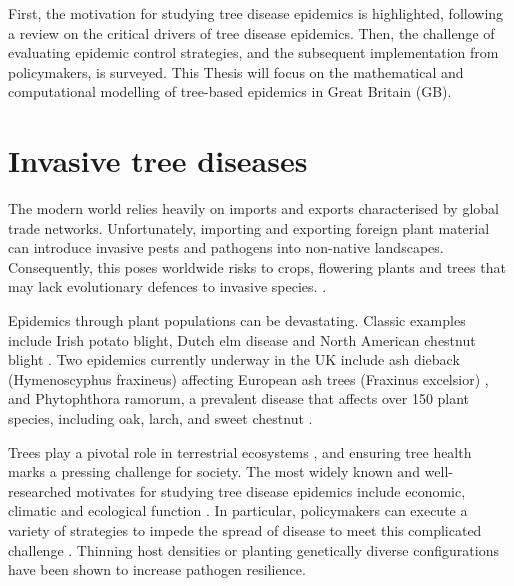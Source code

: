 First, the motivation for studying tree disease epidemics is highlighted, 
following a review on the critical drivers of tree disease epidemics. 
Then, the challenge of evaluating epidemic control strategies, and the subsequent implementation from policymakers, is surveyed.
This Thesis will focus on the mathematical and computational modelling of tree-based epidemics in Great Britain (GB).

\newpage

\section{Invasive tree diseases}

The modern world relies heavily on imports and exports characterised by global trade networks. 
Unfortunately, importing and exporting foreign plant material can introduce invasive pests and pathogens
into non-native landscapes. Consequently, this poses worldwide risks to crops, flowering plants
and trees that may lack evolutionary defences to invasive species. \cite{doi:10.1002/9781444329988.ch8}. 

Epidemics through plant populations can be devastating.
Classic examples include Irish potato blight, Dutch elm disease \cite{doi:10.1111/j.1365-3059.2010.02391.x} 
and North American chestnut blight \cite{doi:10.1002/9780470535486.ch7}.
Two epidemics currently underway in the UK include ash dieback (Hymenoscyphus fraxineus) affecting European ash trees (Fraxinus excelsior)
\cite{ash-dieback-costs}, and Phytophthora ramorum, a prevalent disease that affects over 150 plant species, including oak, 
larch, and sweet chestnut \cite{p.ramourum}.

Trees play a pivotal role in terrestrial ecosystems \cite{boyd2013consequence}, 
and ensuring tree health marks a pressing challenge for society.
The most widely known and well-researched motivates for studying tree disease epidemics include economic,
climatic and ecological function \cite{ash-dieback-costs, freer2017tree, boyd2013consequence, tyrvainen2005benefits}. 
In particular, policymakers can execute a variety of strategies to impede the spread of disease 
to meet this complicated challenge \cite{pests-intro, Gilligan-disease-management}. 
Thinning host densities \cite{resiliency-density-reductions} or planting genetically diverse configurations
\cite{doi:10.1094/PD-89-0969, genetic-heterogeneity, huang1980importance} have been shown to increase
pathogen resilience. 


